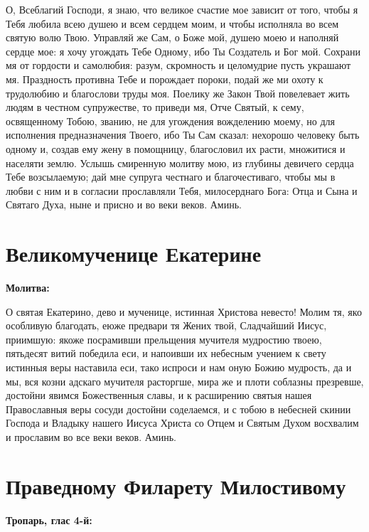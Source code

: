 О, Всеблагий Господи, я знаю, что великое счастие мое зависит от того, чтобы я Тебя любила всею душею и всем сердцем моим, и чтобы исполняла во всем святую волю Твою. Управляй же Сам, о Боже мой, душею моею и наполняй сердце мое: я хочу угождать Тебе Одному, ибо Ты Создатель и Бог мой. Сохрани мя от гордости и самолюбия: разум, скромность и целомудрие пусть украшают мя. Праздность противна Тебе и порождает пороки, подай же ми охоту к трудолюбию и благослови труды моя. Поелику же Закон Твой повелевает жить людям в честном супружестве, то приведи мя, Отче Святый, к сему, освященному Тобою, званию, не для угождения вожделению моему, но для исполнения предназначения Твоего, ибо Ты Сам сказал: нехорошо человеку быть одному и, создав ему жену в помощницу, благословил их расти, множитися и населяти землю. Услышь смиренную молитву мою, из глубины девичего сердца Тебе возсылаемую; дай мне супруга честнаго и благочестиваго, чтобы мы в любви с ним и в согласии прославляли Тебя, милосерднаго Бога: Отца и Сына и Святаго Духа, ныне и присно и во веки веков. Аминь.


\section{Великомученице Екатерине}
 
\bfseries Молитва:\normalfont{}


О святая Екатерино, дево и мученице, истинная Христова невесто! Молим тя, яко особливую благодать, еюже предвари тя Жених твой, Сладчайший Иисус, приимшую: якоже посрамивши прельщения мучителя мудростию твоею, пятьдесят витий победила еси, и напоивши их небесным учением к свету истинныя веры наставила еси, тако испроси и нам оную Божию мудрость, да и мы, вся козни адскаго мучителя расторгше, мира же и плоти соблазны презревше, достойни явимся Божественныя славы, и к расширению святыя нашея Православныя веры сосуди достойни соделаемся, и с тобою в небесней скинии Господа и Владыку нашего Иисуса Христа со Отцем и Святым Духом восхвалим и прославим во все веки веков. Аминь.

 





\section{Праведному Филарету Милостивому}
 
\bfseries Тропарь, глас 4-й:\normalfont{}


